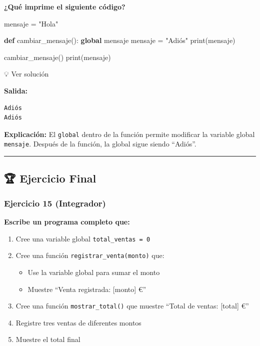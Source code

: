 \documentclass[
  doc,
  floatsintext,
  longtable,
  a4paper,
  nolmodern,
  notxfonts,
  notimes,
  12pt,
  colorlinks=true,linkcolor=blue,citecolor=blue,urlcolor=blue]{apa7}
\newenvironment{Shaded}{\begin{snugshade}}{\end{snugshade}}
\newcommand{\BuiltInTok}[1]{\textcolor[rgb]{0.00,0.23,0.31}{#1}}
\newcommand{\KeywordTok}[1]{\textcolor[rgb]{0.00,0.23,0.31}{\textbf{#1}}}
\newcommand{\NormalTok}[1]{\textcolor[rgb]{0.00,0.23,0.31}{#1}}
\newcommand{\OperatorTok}[1]{\textcolor[rgb]{0.37,0.37,0.37}{#1}}
\newcommand{\StringTok}[1]{\textcolor[rgb]{0.13,0.47,0.30}{#1}}
\providecommand{\tightlist}{%
  \setlength{\itemsep}{0pt}\setlength{\parskip}{0pt}}
\begin{document}
\textbf{¿Qué imprime el siguiente código?}

\begin{Shaded}
\begin{Highlighting}[]
\NormalTok{mensaje }\OperatorTok{=} \StringTok{"Hola"}

\KeywordTok{def}\NormalTok{ cambiar\_mensaje():}
    \KeywordTok{global}\NormalTok{ mensaje}
\NormalTok{    mensaje }\OperatorTok{=} \StringTok{"Adiós"}
    \BuiltInTok{print}\NormalTok{(mensaje)}

\NormalTok{cambiar\_mensaje()}
\BuiltInTok{print}\NormalTok{(mensaje)}
\end{Highlighting}
\end{Shaded}

💡 Ver solución

\textbf{Salida:}

\begin{verbatim}
Adiós
Adiós
\end{verbatim}

\textbf{Explicación:} El \texttt{global} dentro de la función permite
modificar la variable global \texttt{mensaje}. Después de la función, la
global sigue siendo ``Adiós''.

\begin{center}\rule{0.5\linewidth}{0.5pt}\end{center}

\subsection{🏆 Ejercicio Final}\label{ejercicio-final}

\subsubsection{Ejercicio 15 (Integrador)}\label{ejercicio-15-integrador}

\textbf{Escribe un programa completo que:}

\begin{enumerate}
\def\labelenumi{\arabic{enumi}.}
\tightlist
\item
  Cree una variable global \texttt{total\_ventas\ =\ 0}
\item
  Cree una función \texttt{registrar\_venta(monto)} que:

  \begin{itemize}
  \tightlist
  \item
    Use la variable global para sumar el monto
  \item
    Muestre ``Venta registrada: {[}monto{]} €''
  \end{itemize}
\item
  Cree una función \texttt{mostrar\_total()} que muestre ``Total de
  ventas: {[}total{]} €''
\item
  Registre tres ventas de diferentes montos
\item
  Muestre el total final
\end{enumerate}
\end{document}
